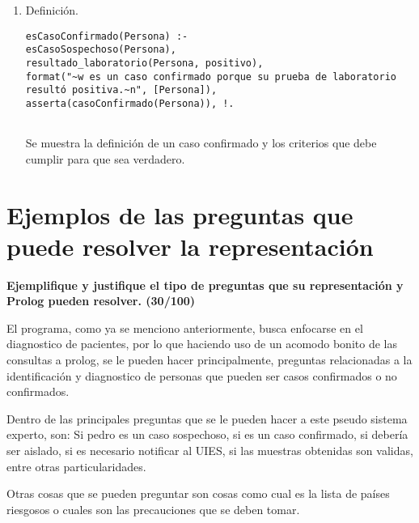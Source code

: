 \documentclass[11pt, letterpaper]{article}
\begin{document}
\begin{enumerate}
		\item		Definición.

\begin{verbatim}
esCasoConfirmado(Persona) :-
esCasoSospechoso(Persona),
resultado_laboratorio(Persona, positivo),
format("~w es un caso confirmado porque su prueba de laboratorio resultó positiva.~n", [Persona]),
asserta(casoConfirmado(Persona)), !.
	
\end{verbatim}

Se muestra la definición de un caso confirmado y los criterios que debe cumplir para que sea verdadero.
		
	\end{enumerate}

\newpage
	
\section{Ejemplos de las preguntas que puede resolver la representación}
	
	\textbf{Ejemplifique y justifique el tipo de preguntas que su representación y Prolog
	pueden resolver. (30/100) }
	
El programa, como ya se menciono anteriormente, busca enfocarse en el diagnostico de pacientes, por lo que haciendo uso de un acomodo bonito de las consultas a prolog, se le pueden hacer principalmente, preguntas relacionadas a la identificación y diagnostico de personas que pueden ser casos confirmados o no confirmados.

Dentro de las principales preguntas que se le pueden hacer a este pseudo sistema experto, son: Si pedro es un caso sospechoso, si es un caso confirmado, si debería ser aislado, si es necesario notificar al UIES, si las muestras obtenidas son validas, entre otras particularidades.

Otras cosas que se pueden preguntar son cosas como cual es la lista de países riesgosos o cuales son las precauciones que se deben tomar.
\end{document}
